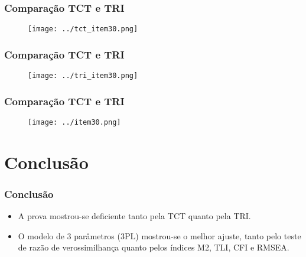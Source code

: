 \documentclass{beamer}
\begin{document}
\begin{frame}
	
	\frametitle{Comparação TCT e TRI}
	\begin{figure}
		\texttt{[image: ../tct\_item30.png]}
	\end{figure}
	
\end{frame}	

\begin{frame}
	
	\frametitle{Comparação TCT e TRI}
	\begin{figure}
		\texttt{[image: ../tri\_item30.png]}
	\end{figure}
	
\end{frame}	

\begin{frame}
	
	\frametitle{Comparação TCT e TRI}
	\begin{figure}
		\texttt{[image: ../item30.png]}
	\end{figure}
	
\end{frame}	

	
\section{Conclusão}
	
	\begin{frame}
		\frametitle{Conclusão}
		
		\begin{itemize}
		\item A prova mostrou-se deficiente tanto pela TCT quanto pela TRI.
		\item O modelo de 3 parâmetros (3PL) mostrou-se o melhor ajuste, tanto pelo teste de razão de verossimilhança quanto pelos índices M2, TLI, CFI e RMSEA.
		\end{itemize}
		
		
	\end{frame}
	
\end{document}
